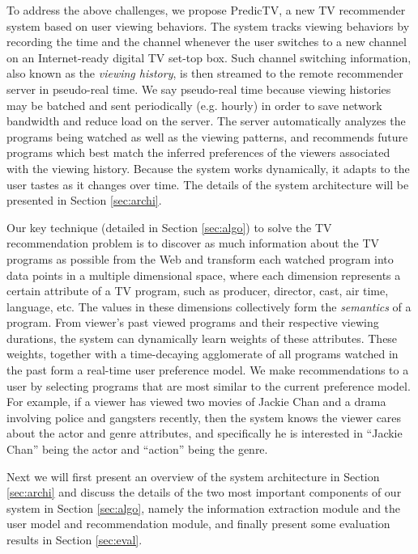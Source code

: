 To address the above challenges,
we propose PredicTV, a new TV recommender system based on
user viewing behaviors. The system tracks viewing
behaviors by recording the time and the channel whenever
the user switches to a new channel on an Internet-ready
digital TV set-top box. Such channel switching information,
also known as the {\em viewing history}, is
then streamed to the remote recommender server in pseudo-real time.
We say pseudo-real time because viewing histories may be batched
and sent periodically (e.g. hourly) in order to save network bandwidth and
reduce load on the server.
The server automatically analyzes
the programs being watched as well as the viewing patterns,
and recommends future programs which best match the inferred
preferences of the viewers associated with the viewing
history. Because the system works dynamically, it
adapts to the user tastes as it changes over time. The
details of the system architecture will be presented in
Section \ref{sec:archi}.

Our key technique (detailed in Section \ref{sec:algo})
to solve the TV recommendation problem
is  to discover as much information about
the TV programs as possible from the Web and transform each watched
program into data points in a multiple dimensional space, where
each dimension represents a certain attribute of a TV program, such
as producer, director, cast, air time, language, etc. The values in
these dimensions collectively form the {\em semantics} of a program.
From viewer's past viewed programs and their respective viewing durations,
the system can dynamically learn weights of these attributes. These weights,
together with a time-decaying agglomerate of all programs watched in
the past form a real-time user preference model. We make recommendations
to a user by selecting programs that are most similar to the current
preference model. For example,
if a viewer has viewed two movies of Jackie Chan and a drama involving
police and gangsters recently,
then the system knows the viewer cares about the actor and genre attributes,
and specifically he is interested in ``Jackie Chan'' being the actor and
``action'' being the genre.

Next we will first present an overview of the system architecture
in Section \ref{sec:archi} and discuss the details of the two most
important components of our system in Section \ref{sec:algo},
namely the information extraction
module and the user model and recommendation module, and finally present
some evaluation results in Section \ref{sec:eval}.

